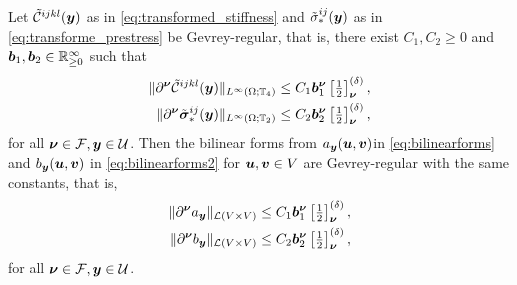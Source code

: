 \begin{remark}\label{remark:RegularityCoefficientToBilinearForm}
Let $\tilde{\calC}^{ijkl}(\bsy)$ as in \eqref{eq:transformed_stiffness} and $\tilde{\sigma}_*^{ij}(\bsy)$ as in \eqref{eq:transforme_prestress} be Gevrey-regular, that is, 
there exist $C_1,C_2 \geq 0$ and $\bsb_1, \bsb_2 \in \R^\infty_{\geq 0}$ such that
\begin{align}\label{eq:Gevrey_assump1}
     \|\D^{\bsnu} \tilde{\calC}^{ijkl}(\bsy) \|_{L^\infty(\Omega;\mathbb{T}_4)} &\leq C_1 \bsb_1^\bsnu \fallennudelta,  \\
     \label{eq:Gevrey_assump2}
      \| \D^{\bsnu}\tilde{\bssigma}_*^{ij}(\bsy) \|_{L^\infty(\Omega;\mathbb{T}_2)} &\leq  C_2 \bsb_2^\bsnu \fallennudelta, 
\end{align}
for all $\bsnu \in \calF, \bsy \in \calU$.
Then the bilinear forms from $  a_\bsy(\bsu, \bsv) $in \eqref{eq:bilinearforms} and  $ b_\bsy(\bsu, \bsv)  $  in \eqref{eq:bilinearforms2} for $\bsu, \bsv \in V$ are Gevrey-regular with the same constants, that is,
\begin{align*}
     \|\D^{\bsnu}a_\bsy \|_{\calL(V \times V) } &\leq C_1 \bsb_1^\bsnu \fallennudelta,  \\
      \|\D^{\bsnu} b_\bsy \|_{\calL(V \times V) } &\leq  C_2 \bsb_2^\bsnu \fallennudelta, 
\end{align*} for all $\bsnu \in \calF, \bsy \in \calU$.
\end{remark}
